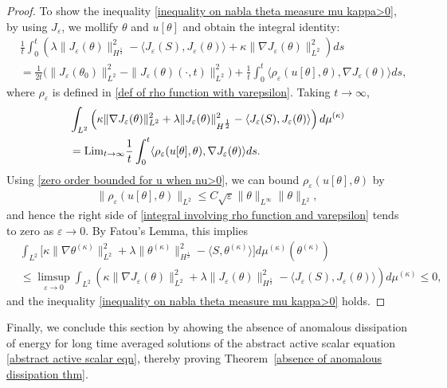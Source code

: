 \documentclass[reqno]{amsart}%
\theoremstyle{definition}
\theoremstyle{remark}
\numberwithin{equation}{section}
\newcommand{\1}{\mathbf{1}}
\numberwithin{equation}{section}
\numberwithin{theorem}{section}
\numberwithin{figure}{section}
\begin{document}
\begin{proof}
To show the inequality \eqref{inequality on nabla theta measure mu kappa>0}, by using $J_{\varepsilon}$, we mollify $\theta$ and $u[\theta]$ and obtain the integral identity:
\begin{align*}
&\frac{1}{t}\int_{0}^{t}\left(\lambda\|J_{\varepsilon}(\theta)\|_{H^\frac{1}{2}}^2-\langle J_{\varepsilon}(S),J_{\varepsilon}(\theta)\rangle+\kappa\|\nabla J_{\varepsilon}(\theta)\|_{L^2}^2\right)ds\\
&=\frac{1}{2t}\Big(\|J_{\varepsilon}(\theta_0)\|_{L^2}^2-\|J_{\varepsilon}(\theta)(\cdot,t)\|_{L^2}^2\Big)+\frac{1}{t}\int_{0}^{t}\langle\rho_\varepsilon(u[\theta],\theta),\nabla J_{\varepsilon}(\theta)\rangle ds,
\end{align*}
where $\rho_\varepsilon$ is defined in \eqref{def of rho function with varepsilon}. Taking $t\to\infty$,
\begin{align}\label{integral involving rho function and varepsilon}
&\int_{L^2}\left(\kappa\|\nabla J_{\varepsilon}(\theta)\|_{L^2}^2+\lambda\|J_{\varepsilon}(\theta)\|_{H^\frac{1}{2}}^2-\langle J_{\varepsilon}(S),J_{\varepsilon}(\theta)\rangle\right)d\mu^{(\kappa)}\notag\\
&={\rm Lim}_{t\to\infty}\frac{1}{t}\int_{0}^{t}\langle\rho_\varepsilon(u[\theta],\theta),\nabla J_{\varepsilon}(\theta)\rangle ds.
\end{align}
Using \eqref{zero order bounded for u when nu>0}, we can bound $\rho_\varepsilon(u[\theta],\theta)$ by
\begin{align*}
\|\rho_\varepsilon(u[\theta],\theta)\|_{L^2}\le C\sqrt{\varepsilon}\|\theta\|_{L^\infty}\|\theta\|_{L^2},
\end{align*}
and hence the right side of \eqref{integral involving rho function and varepsilon} tends to zero as $\varepsilon\to0$. By Fatou's Lemma, this implies 
\begin{align*}
&\int_{L^2}\Big[\kappa\|\nabla\theta^{(\kappa)}\|_{L^2}^2+\lambda\|\theta^{(\kappa)}\|_{H^\frac{1}{2}}^2-\langle S,\theta^{(\kappa)}\rangle\Big]d\mu^{(\kappa)}(\theta^{(\kappa)})\\
&\le\limsup_{\varepsilon\to0}\int_{L^2}\left(\kappa\|\nabla J_{\varepsilon}(\theta)\|_{L^2}^2+\lambda\|J_{\varepsilon}(\theta)\|_{H^\frac{1}{2}}^2-\langle J_{\varepsilon}(S),J_{\varepsilon}(\theta)\rangle\right)d\mu^{(\kappa)}\le 0,
\end{align*}
and the inequality \eqref{inequality on nabla theta measure mu kappa>0} holds.
\end{proof}
Finally, we conclude this section by ahowing the absence of anomalous dissipation of energy for long time averaged solutions of the abstract active scalar equation \eqref{abstract active scalar eqn}, thereby proving Theorem~\ref{absence of anomalous dissipation thm}. 
\end{document}
